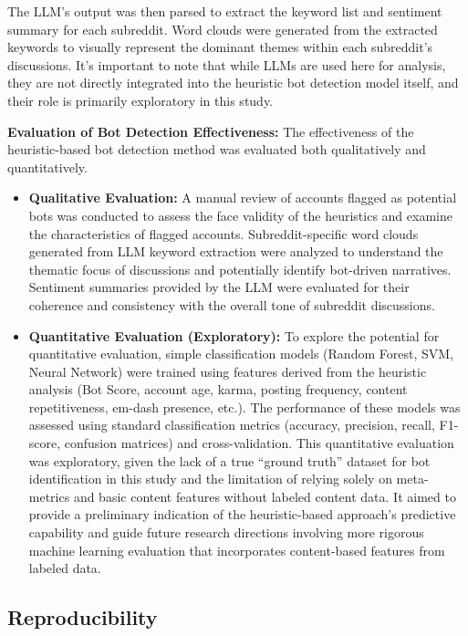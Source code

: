 \documentclass[
  12pt,
  letterpaper,
  DIV=11,
  numbers=noendperiod]{scrartcl}
\begin{document}
The LLM's output was then parsed to extract the keyword list and
sentiment summary for each subreddit. Word clouds were generated from
the extracted keywords to visually represent the dominant themes within
each subreddit's discussions. It's important to note that while LLMs are
used here for analysis, they are not directly integrated into the
heuristic bot detection model itself, and their role is primarily
exploratory in this study.

\textbf{Evaluation of Bot Detection Effectiveness:} The effectiveness of
the heuristic-based bot detection method was evaluated both
qualitatively and quantitatively.

\begin{itemize}
\item
  \textbf{Qualitative Evaluation:} A manual review of accounts flagged
  as potential bots was conducted to assess the face validity of the
  heuristics and examine the characteristics of flagged accounts.
  Subreddit-specific word clouds generated from LLM keyword extraction
  were analyzed to understand the thematic focus of discussions and
  potentially identify bot-driven narratives. Sentiment summaries
  provided by the LLM were evaluated for their coherence and consistency
  with the overall tone of subreddit discussions.
\item
  \textbf{Quantitative Evaluation (Exploratory):} To explore the
  potential for quantitative evaluation, simple classification models
  (Random Forest, SVM, Neural Network) were trained using features
  derived from the heuristic analysis (Bot Score, account age, karma,
  posting frequency, content repetitiveness, em-dash presence, etc.).
  The performance of these models was assessed using standard
  classification metrics (accuracy, precision, recall, F1-score,
  confusion matrices) and cross-validation. This quantitative evaluation
  was exploratory, given the lack of a true ``ground truth'' dataset for
  bot identification in this study and the limitation of relying solely
  on meta-metrics and basic content features without labeled content
  data. It aimed to provide a preliminary indication of the
  heuristic-based approach's predictive capability and guide future
  research directions involving more rigorous machine learning
  evaluation that incorporates content-based features from labeled data.
\end{itemize}

\subsection{Reproducibility}\label{reproducibility}
\end{document}
